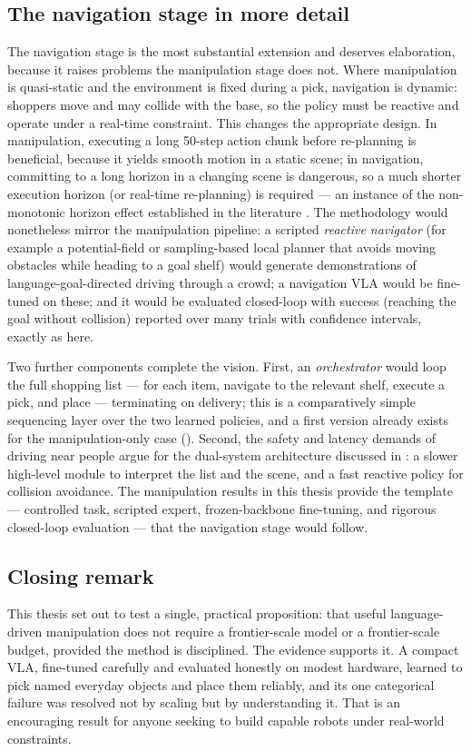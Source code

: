 \subsection{The navigation stage in more detail}
\label{sec:future-nav}
The navigation stage is the most substantial extension and deserves elaboration,
because it raises problems the manipulation stage does not. Where manipulation is
quasi-static and the environment is fixed during a pick, navigation is dynamic:
shoppers move and may collide with the base, so the policy must be reactive and
operate under a real-time constraint. This changes the appropriate design. In
manipulation, executing a long 50-step action chunk before re-planning is beneficial,
because it yields smooth motion in a static scene; in navigation, committing to a long
horizon in a changing scene is dangerous, so a much shorter execution horizon (or
real-time re-planning) is required --- an instance of the non-monotonic
horizon effect established in the literature \parencite{wang2026vlalimits}. The methodology
would nonetheless mirror the manipulation pipeline: a scripted \emph{reactive
navigator} (for example a potential-field or sampling-based local planner that avoids
moving obstacles while heading to a goal shelf) would generate demonstrations of
language-goal-directed driving through a crowd; a navigation VLA would be fine-tuned on
these; and it would be evaluated closed-loop with success (reaching the goal without
collision) reported over many trials with confidence intervals, exactly as here.

Two further components complete the vision. First, an \emph{orchestrator} would loop
the full shopping list --- for each item, navigate to the relevant shelf, execute a
pick, and place --- terminating on delivery; this is a comparatively simple
sequencing layer over the two learned policies, and a first version already exists for
the manipulation-only case (). Second, the safety and
latency demands of driving near people argue for the dual-system architecture
discussed in : a slower high-level module to interpret the list
and the scene, and a fast reactive policy for collision avoidance. The manipulation
results in this thesis provide the template --- controlled task, scripted expert,
frozen-backbone fine-tuning, and rigorous closed-loop evaluation --- that the
navigation stage would follow.

\subsection{Closing remark}
\label{sec:closing}
This thesis set out to test a single, practical proposition: that useful
language-driven manipulation does not require a frontier-scale model or a
frontier-scale budget, provided the method is disciplined. The evidence supports it.
A compact VLA, fine-tuned carefully and evaluated honestly on modest hardware, learned
to pick named everyday objects and place them reliably, and its one categorical
failure was resolved not by scaling but by understanding it. That is an encouraging
result for anyone seeking to build capable robots under real-world constraints.
